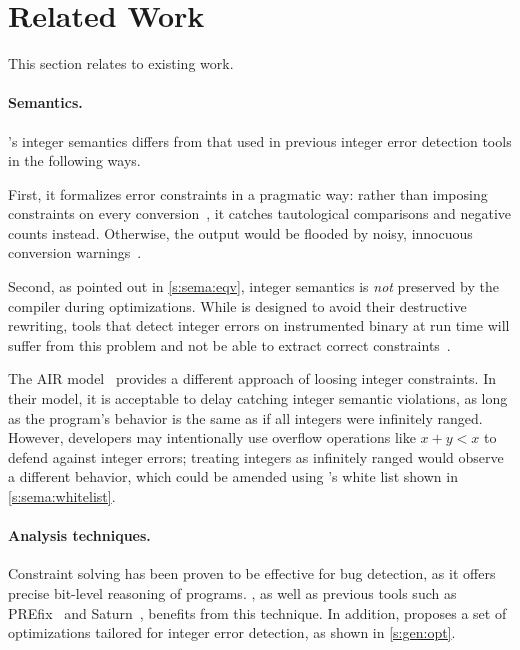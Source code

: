 \section{Related Work}
\label{s:relwk}

This section relates \sys to existing work.

\paragraph{Semantics.}
\sys's integer semantics differs from that used in previous integer
error detection tools in the following ways.

First, it formalizes error constraints in a pragmatic way: rather
than imposing constraints on every conversion~\cite{brumley:rich,
moy:prefix, seacord:secure-c}, it catches tautological comparisons
and negative counts instead.  Otherwise, the output would be flooded
by noisy, innocuous conversion warnings~\cite{moy:prefix}.

Second, as pointed out in \autoref{s:sema:eqv}, integer semantics
is \emph{not} preserved by the compiler during optimizations.  While
\sys is designed to avoid their destructive rewriting, tools that
detect integer errors on instrumented binary at run time will suffer
from this problem and not be able to extract correct
constraints~\cite{molnar:catchconv, intscope}.

The AIR model~\cite{air} provides a different approach of loosing
integer constraints.  In their model, it is acceptable to delay
catching integer semantic violations, as long as the program's
behavior is the same as if all integers were infinitely ranged.
However, developers may intentionally use overflow operations like
$x + y < x$ to defend against integer errors; treating integers as
infinitely ranged would observe a different behavior, which could
be amended using \sys's white list shown in \autoref{s:sema:whitelist}.

\paragraph{Analysis techniques.}

Constraint solving has been proven to be effective for bug detection,
as it offers precise bit-level reasoning of programs.  \sys, as
well as previous tools such as PREfix~\cite{moy:prefix} and
Saturn~\cite{xie:saturn}, benefits from this technique.  In addition,
\sys proposes a set of optimizations tailored for integer error
detection, as shown in \autoref{s:gen:opt}.


